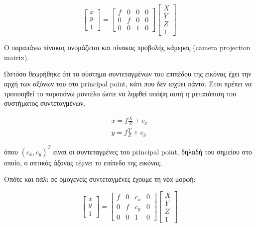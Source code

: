 \begin{equation}
\begin{bmatrix}
x\\y\\1
\end{bmatrix}
=
\begin{bmatrix}
f & 0 & 0 & 0\\
0 & f & 0 & 0\\
0 & 0 & 1 & 0
\end{bmatrix}
\begin{bmatrix}
X\\
Y\\
Z\\
1
\end{bmatrix}
\end{equation}



Ο παραπάνω πίνακας ονομάζεται και πίνακας προβολής κάμερας (camera projection matrix).





Ωστόσο θεωρήθηκε ότι το σύστημα συντεταγμένων του επιπέδου της εικόνας έχει την αρχή των αξόνων του στο principal point, κάτι που δεν ισχύει πάντα. Έτσι πρέπει να τροποιηθεί το παραπάνω μοντέλο ώστε να ληφθεί υπόψη αυτή η μετατόπιση του συστήματος συντεταγμένων.



\begin{equation}
\begin{aligned}
x=f\frac{X}{Z}+c_{x}\\[0.3cm]
y=f\frac{Y}{Z}+c_{y}
\end{aligned}
\end{equation}

όπου $(c_{x},c_{y})^{T}$ είναι οι συντεταγμένες του principal point, δηλαδή του σημείου στο οποίο, ο οπτικός άξονας τέμνει το επίπεδο της εικόνας. 

Οπότε και πάλι σε ομογενείς συντεταγμένες έχουμε τη νέα μορφή:

\begin{equation}
\begin{bmatrix}
x\\y\\1
\end{bmatrix}
=
\begin{bmatrix}
f & 0 & c_{x} & 0\\
0 & f & c_{y} & 0\\
0 & 0 & 1 & 0
\end{bmatrix}
\begin{bmatrix}
X\\
Y\\
Z\\
1
\end{bmatrix}
\end{equation}

